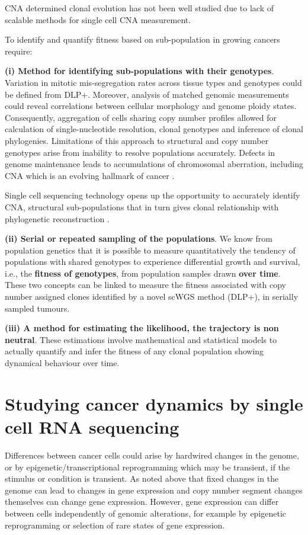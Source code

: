 CNA determined clonal evolution has not been well studied due to lack of scalable methods for single cell CNA measurement.

To identify and quantify fitness based on sub-population in growing cancers require: 

\textbf{(i) Method for identifying sub-populations with their genotypes}.
Variation in mitotic mis-segregation rates across tissue types and genotypes could be defined from DLP+. Moreover, analysis of matched genomic measurements could reveal correlations between cellular morphology and genome ploidy states. Consequently, aggregation of cells sharing copy number profiles allowed for calculation of single-nucleotide resolution, clonal genotypes and inference of clonal phylogenies.
Limitations of this approach to structural and copy number genotypes arise from inability to resolve populations accurately. Defects in genome maintenance leads to accumulations of chromosomal aberration, including \ac{CNA} which is an evolving hallmark of cancer \cite{negrini2010genomic}. 


Single cell sequencing technology opens up the opportunity to accurately identify CNA, structural sub-populations that in turn gives clonal relationship with phylogenetic reconstruction \cite{satas2020scarlet, dorri2020efficient}. 

\textbf{(ii) Serial or repeated sampling of the populations}.
We know from population genetics that it is possible to measure quantitatively the tendency of populations with shared genotypes to experience differential growth and survival, i.e., the \textbf{fitness of genotypes}, from population samples drawn \textbf{over time}.
These two concepts can be linked to measure the fitness associated with copy number assigned clones identified by a novel scWGS method (DLP+), in serially sampled tumours.

\textbf{(iii) A method for estimating the likelihood, the trajectory is non neutral}.
These estimations involve mathematical and statistical models to actually quantify and infer the fitness of any clonal population showing dynamical behaviour over time.



\section{Studying cancer dynamics by single cell RNA sequencing}

Differences between cancer cells could arise by hardwired changes in the genome, or by epigenetic/transcriptional reprogramming which may be transient, if the stimulus or condition is transient. 
As noted above that fixed changes in the genome can lead to changes in gene expression and copy number segment changes themselves can change gene expression.
However, gene expression can differ between cells independently of genomic alterations, for example by epigenetic reprogramming or selection of rare states of gene expression.

